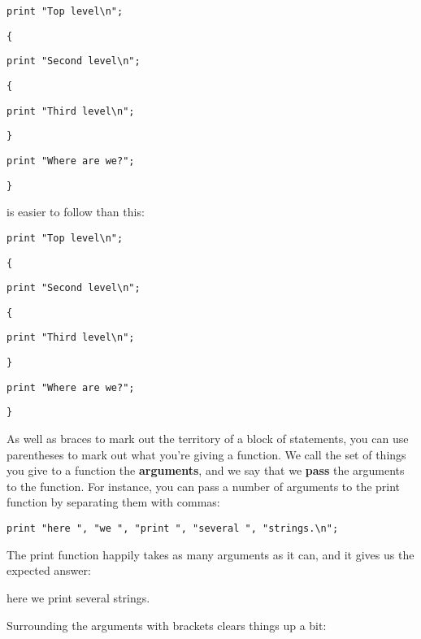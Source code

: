\documentclass[a4paper,12pt,twoside]{book}
\begin{document}
\noindent 

\noindent \texttt{print "Top level\textbackslash n";}

\noindent \texttt{\{}

\noindent \texttt{print "Second level\textbackslash n";}

\noindent \texttt{\{}

\noindent \texttt{print "Third level\textbackslash n";}

\noindent \texttt{\}}

\noindent \texttt{print "Where are we?";}

\noindent \texttt{\}}

\noindent 

\noindent is easier to follow than this:

\noindent 

\noindent \texttt{print "Top level\textbackslash n";}

\noindent \texttt{\{}

\noindent \texttt{print "Second level\textbackslash n";}

\noindent \texttt{\{}

\noindent \texttt{print "Third level\textbackslash n";}

\noindent \texttt{\}}

\noindent \texttt{print "Where are we?";}

\noindent \texttt{\}}

\noindent 

\noindent As well as braces to mark out the territory of a block of statements, you can use parentheses to mark out what you're giving a function. We call the set of things you give to a function the \textbf{arguments}, and we say that we \textbf{pass }the arguments to the function. For instance, you can pass a number of arguments to the print function by separating them with commas:

\noindent 

\noindent \texttt{print "here ", "we ", "print ", "several ", "strings.\textbackslash n";}

\noindent 

\noindent The print function happily takes as many arguments as it can, and it gives us the expected answer:

\noindent 

\noindent here we print several strings.

\noindent 

\noindent Surrounding the arguments with brackets clears things up a bit:
\end{document}
